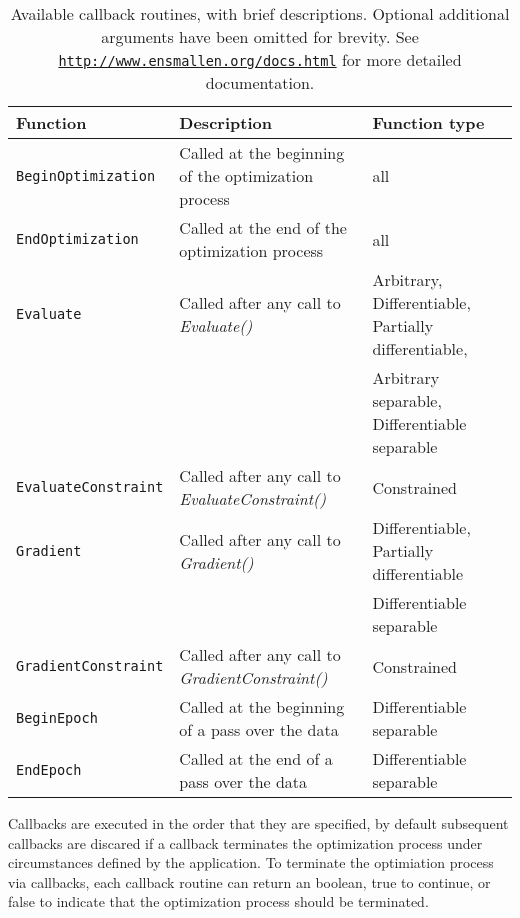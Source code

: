 \begin{table}[H]
\centering
\small
\begin{tabular}{lll}
\toprule
{\bf Function} & {\bf Description} & {\bf Function type} \\
\hline
\texttt{BeginOptimization}   & Called at the beginning of the optimization process  & all \\
\texttt{EndOptimization}     & Called at the end of the optimization process        & all \\
\texttt{Evaluate}            & Called after any call to {\it Evaluate()}            & Arbitrary, Differentiable, Partially differentiable,  \\
                             &                                                      & Arbitrary separable, Differentiable separable \\
\texttt{EvaluateConstraint}  & Called after any call to {\it EvaluateConstraint()}  & Constrained \\
\texttt{Gradient}            & Called after any call to {\it Gradient()}            & Differentiable, Partially differentiable \\
                             &                                                      & Differentiable separable \\
\texttt{GradientConstraint}  & Called after any call to {\it GradientConstraint()}  & Constrained \\
\texttt{BeginEpoch}          & Called at the beginning of a pass over the data      & Differentiable separable \\
\texttt{EndEpoch}            & Called at the end of a pass over the data            & Differentiable separable \\

\bottomrule
\end{tabular}
\vspace{0.5ex}
\caption
  {
  Available callback routines, with brief descriptions.
  Optional additional arguments have been omitted for brevity.
  See {\href{http://www.ensmallen.org/docs.html}{\mbox{\tt http://www.ensmallen.org/docs.html}}} for more detailed documentation.
  }
\label{tab:callback_list}
\end{table}

Callbacks are executed in the order that they are specified, by default
subsequent callbacks are discared if a callback terminates the optimization
process under circumstances defined by the application. To terminate the
optimiation process via callbacks, each callback routine can return an boolean,
true to continue, or false to indicate that the optimization process should be
terminated.

